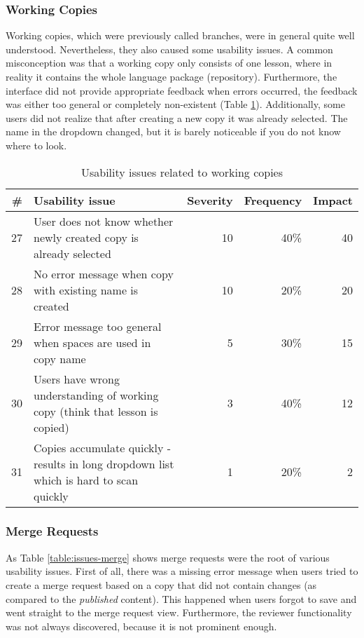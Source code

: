 \subsubsection{Working Copies}
Working copies, which were previously called branches, were in general quite well understood. Nevertheless, they also caused some usability issues. A common misconception was that a working copy only consists of one lesson, where in reality it contains the whole language package (repository).
Furthermore, the interface did not provide appropriate feedback when errors occurred, the feedback was either too general or completely non-existent (Table \ref{table:issues-copies}). Additionally, some users did not realize that after creating a new copy it was already selected. The name in the dropdown changed, but it is barely noticeable if you do not know where to look.


\begin{table}[h!]
\centering
\begin{tabular}{|r|p{7cm}|r|r|r|}
\hline
\rowcolor[HTML]{EFEFEF}
{\bf \#} & {\bf Usability issue} & {\bf Severity} & {\bf Frequency} & {\bf Impact} \\ \hline
27 & User does not know whether newly created copy is already selected & 10 & 40\% & 40 \\ \hline
28 & No error message when copy with existing name is created & 10 & 20\% & 20 \\ \hline
29 & Error message too general when spaces are used in copy name & 5 & 30\% & 15 \\ \hline
30 & Users have wrong understanding of working copy (think that lesson is copied) & 3 & 40\% & 12 \\ \hline
31 & Copies accumulate quickly - results in long dropdown list which is hard to scan quickly & 1 & 20\% & 2 \\ \hline
\end{tabular}
\caption{Usability issues related to working copies}
\label{table:issues-copies}
\end{table}

\subsubsection{Merge Requests}
As Table \ref{table:issues-merge} shows merge requests were the root of various usability issues. First of all, there was a missing error message when users tried to create a merge request based on a copy that did not contain changes (as compared to the \textit{published} content). This happened when users forgot to save and went straight to the merge request view. Furthermore, the reviewer functionality was not always discovered, because it is not prominent enough.

